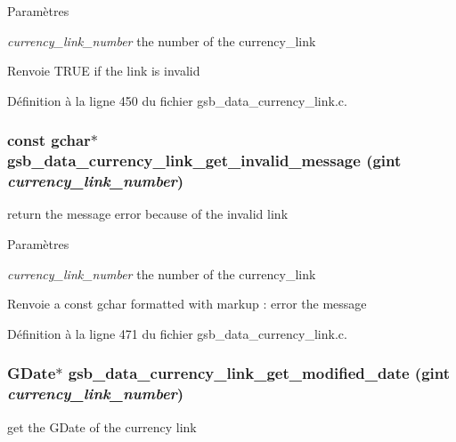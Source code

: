 \begin{DoxyParams}{Paramètres}
\item[{\em currency\_\-link\_\-number}]the number of the currency\_\-link\end{DoxyParams}
\begin{DoxyReturn}{Renvoie}
TRUE if the link is invalid 
\end{DoxyReturn}


Définition à la ligne 450 du fichier gsb\_\-data\_\-currency\_\-link.c.

\subsubsection[{gsb\_\-data\_\-currency\_\-link\_\-get\_\-invalid\_\-message}]{\setlength{\rightskip}{0pt plus 5cm}const gchar$\ast$ gsb\_\-data\_\-currency\_\-link\_\-get\_\-invalid\_\-message (gint {\em currency\_\-link\_\-number})}\label{gsb__data__currency__link_8h_a2e557736f1bcf1f082a81f73a36542c1}
return the message error because of the invalid link


\begin{DoxyParams}{Paramètres}
\item[{\em currency\_\-link\_\-number}]the number of the currency\_\-link\end{DoxyParams}
\begin{DoxyReturn}{Renvoie}
a const gchar formatted with markup : error the message 
\end{DoxyReturn}


Définition à la ligne 471 du fichier gsb\_\-data\_\-currency\_\-link.c.

\subsubsection[{gsb\_\-data\_\-currency\_\-link\_\-get\_\-modified\_\-date}]{\setlength{\rightskip}{0pt plus 5cm}GDate$\ast$ gsb\_\-data\_\-currency\_\-link\_\-get\_\-modified\_\-date (gint {\em currency\_\-link\_\-number})}\label{gsb__data__currency__link_8h_aa69aa5e3a5a36188b6b78e37f72a566c}
get the GDate of the currency link


